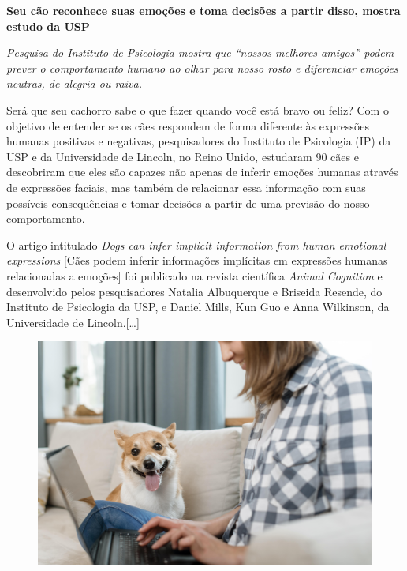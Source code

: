 \begin{myquote}
\begin{center}
\noindent\textbf{Seu cão reconhece suas emoções e toma decisões a partir disso, mostra estudo da USP}

\noindent \small{\emph{Pesquisa do Instituto de Psicologia mostra que ``nossos melhores
amigos'' podem prever o comportamento humano ao olhar para nosso rosto e
diferenciar emoções neutras, de alegria ou raiva.}}
\end{center}
\medskip

\noindent Será que seu cachorro sabe o que fazer quando você está bravo ou feliz?
Com o objetivo de entender se os cães respondem de forma diferente às
expressões humanas positivas e negativas, pesquisadores do Instituto de
Psicologia (IP) da USP e da Universidade de Lincoln, no Reino Unido,
estudaram 90 cães e descobriram que eles são capazes não apenas de
inferir emoções humanas através de expressões faciais, mas também de
relacionar essa informação com suas possíveis consequências e tomar
decisões a partir de uma previsão do nosso comportamento.

O artigo intitulado \emph{Dogs can infer implicit information from human
emotional expressions} {[}Cães podem inferir informações
  implícitas em expressões humanas relacionadas a emoções{]} 
foi publicado na
 revista científica \emph{Animal Cognition} e desenvolvido pelos
 pesquisadores Natalia Albuquerque e Briseida Resende, do Instituto de
 Psicologia da USP, e Daniel Mills, Kun Guo e Anna Wilkinson, da Universidade
 de Lincoln.{[}\ldots{}{]}

\begin{figure}[H]
\centering\includegraphics[width=.9\textwidth]{./imgSAEB_6_POR/freepik/PORT_6_IMG-8.jpeg}
\end{figure}


\end{myquote}
